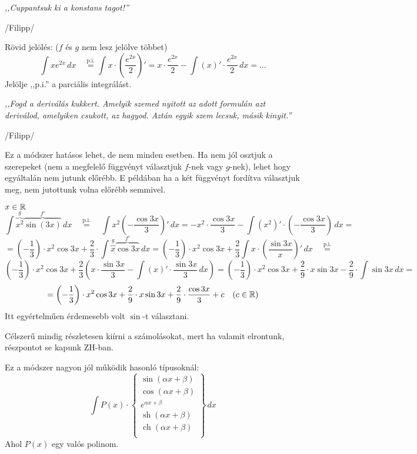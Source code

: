 \documentclass[a4paper,11.5pt]{article}
\DeclareMathOperator{\sh}{sh}
\DeclareMathOperator{\ch}{ch}
\begin{document}
	\begin{center}
		\textit{,,Cuppantsuk ki a konstans tagot!''}
		\smallskip
		
		/Filipp/
	\end{center}
	
	\begin{note}
		Rövid jelölés: ($f$ és $g$ nem lesz jelölve többet)
		\[ \int xe^{2x}\,dx\quad \overset{\text{p.i.}}{=}\int x\cdot\left( \frac{e^{2x}}{2}\right)'=x\cdot\frac{e^{2x}}{2}-\int(x)'\cdot\frac{e^{2x}}{2}\,dx=\ldots \]
		Jelölje ,,p.i.'' a parciális integrálást.
	\end{note}
	\begin{center}
		\textit{,,Fogd a deriválás kukkert. Amelyik szemed nyitott az adott formulán azt deriválod, amelyiken csukott, az hagyod. Aztán egyik szem lecsuk, másik kinyit.''}
		
		\smallskip
		/Filipp/
	\end{center}
	\begin{note}
		Ez a módszer hatásos lehet, de nem minden esetben. Ha nem jól osztjuk a szerepeket (nem a megfelelő függvényt választjuk $f$-nek vagy $g$-nek), lehet hogy egyáltalán nem jutunk előrébb. E példában ha a két függvényt fordítva választjuk meg, nem jutottunk volna előrébb semmivel.
	\end{note}
	\begin{task}$x\in\mathbb{R}$
		\[ \int \overbrace{x^2}^{g}\overbrace{\sin(3x)}^{f'}\,dx \quad \overset{\text{p.i.}}{=}\quad  \int x^2\left(-\frac{\cos3x}{3}\right)'\,dx=-x^2\cdot\frac{\cos3x}{3}-\int\left(x^2\right)'\cdot\left(-\frac{\cos3x}{3}\right)\,dx=\]
		\[=\left(-\frac{1}{3}\right)\cdot x^2\cos3x+\frac{2}{3}\cdot\int \overbrace{x}^{g}\overbrace{\cos3x}^{f'}\,dx=\left(-\frac{1}{3}\right)\cdot x^2\cos3x+\frac{2}{3}\int x\cdot\left( \frac{\sin3x}{x}\right)'\,dx\quad \overset{\text{p.i.}}{=} \]
		\[  \left(-\frac{1}{3}\right)\cdot x^2\cos3x+\frac{2}{3}\left(x\cdot\frac{\sin3x}{3}-\int(x)'\cdot\frac{\sin3x}{3}\,dx\right)=\left(-\frac{1}{3}\right)\cdot x^2\cos3x+\frac{2}{9}\cdot x\sin3x-\frac{2}{9}\cdot\int\sin3x\,dx=\]
		\[=\left(-\frac{1}{3}\right) \cdot x^2\cos3x+\frac{2}{9}\cdot
		x\sin3x+\frac{2}{9}\cdot\frac{\cos3x}{3} + c\quad (c\in\mathbb{R}) \]
		Itt egyértelműen érdemesebb volt $\sin$-t választani.
	\end{task}
	\begin{note}
		Célszerű mindig részletesen kiírni a számolásokat, mert ha valamit elrontunk, részpontot se kapunk ZH-ban.
	\end{note}
	\begin{note}
		Ez a módszer nagyon jól működik hasonló típusoknál:
		\[ \int P(x)\cdot
		\left.\begin{cases}
			\sin(\alpha x+\beta)\\
			\cos(\alpha x+\beta)\\
			e^{\alpha x+\beta}\\
			\sh(\alpha x+\beta)\\
			\ch(\alpha x+\beta)\\
		\end{cases}\right\}\,dx \]
		Ahol $P(x)$ egy valós polinom.
	\end{note}
\end{document}
